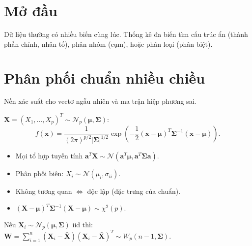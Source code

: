 \documentclass[12pt,a4paper]{article}
\begin{document}

\newpage
\tableofcontents
\newpage



\section{Mở đầu}

\begin{dongco}[title={Động cơ --- Mở đầu}]
Dữ liệu thường có nhiều biến cùng lúc. Thống kê đa biến tìm cấu trúc ẩn (thành phần chính, nhân tố), phân nhóm (cụm), hoặc phân loại (phân biệt).
\end{dongco}

\newpage

\section{Phân phối chuẩn nhiều chiều}

\begin{dongco}[title={Động cơ --- Phân phối chuẩn nhiều chiều}]
Nền xác suất cho vectơ ngẫu nhiên và ma trận hiệp phương sai.
\end{dongco}

\begin{dinhnghia}
  $\mathbf{X} = (X_1, \ldots, X_p)^T \sim \mathcal{N}_p(\boldsymbol{\mu}, \boldsymbol{\Sigma})$:
  \[
    f(\mathbf{x}) = \frac{1}{(2\pi)^{p/2}|\boldsymbol{\Sigma}|^{1/2}}\exp\!\left(-\frac{1}{2}(\mathbf{x}-\boldsymbol{\mu})^T\boldsymbol{\Sigma}^{-1}(\mathbf{x}-\boldsymbol{\mu})\right).
  \]
\end{dinhnghia}

\begin{tinhchat}
  \begin{itemize}
    \item Mọi tổ hợp tuyến tính $\mathbf{a}^T\mathbf{X} \sim \mathcal{N}(\mathbf{a}^T\boldsymbol{\mu}, \mathbf{a}^T\boldsymbol{\Sigma}\mathbf{a})$.
    \item Phân phối biên: $X_i \sim \mathcal{N}(\mu_i, \sigma_{ii})$.
    \item Không tương quan $\Leftrightarrow$ độc lập (đặc trưng của chuẩn).
    \item $(\mathbf{X}-\boldsymbol{\mu})^T\boldsymbol{\Sigma}^{-1}(\mathbf{X}-\boldsymbol{\mu}) \sim \chi^2(p)$.
  \end{itemize}
\end{tinhchat}

\begin{dinhly}[title={Phân phối Wishart}]
  Nếu $\mathbf{X}_i \sim \mathcal{N}_p(\boldsymbol{\mu}, \boldsymbol{\Sigma})$ iid thì:
  $\mathbf{W} = \sum_{i=1}^n (\mathbf{X}_i - \bar{\mathbf{X}})(\mathbf{X}_i - \bar{\mathbf{X}})^T \sim W_p(n-1, \boldsymbol{\Sigma})$.
\end{dinhly}
\end{document}
